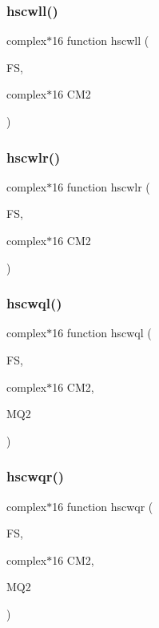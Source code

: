 \subsubsection{\texorpdfstring{hscwll()}{hscwll()}}
{\footnotesize\ttfamily complex$\ast$16 function hscwll (\begin{DoxyParamCaption}\item[{}]{FS,  }\item[{complex$\ast$16}]{C\+M2 }\end{DoxyParamCaption})}

\mbox{\label{djangoh__h_8f_aa1ed15a3dc1205d55ee3a8eeb774b5d5}} 
\subsubsection{\texorpdfstring{hscwlr()}{hscwlr()}}
{\footnotesize\ttfamily complex$\ast$16 function hscwlr (\begin{DoxyParamCaption}\item[{}]{FS,  }\item[{complex$\ast$16}]{C\+M2 }\end{DoxyParamCaption})}

\mbox{\label{djangoh__h_8f_a5bbc131d71e97e7f06c2e867bec24eec}} 
\subsubsection{\texorpdfstring{hscwql()}{hscwql()}}
{\footnotesize\ttfamily complex$\ast$16 function hscwql (\begin{DoxyParamCaption}\item[{}]{FS,  }\item[{complex$\ast$16}]{C\+M2,  }\item[{}]{M\+Q2 }\end{DoxyParamCaption})}

\mbox{\label{djangoh__h_8f_a67a8dbf09bfd8e694c25a01bc0341653}} 
\subsubsection{\texorpdfstring{hscwqr()}{hscwqr()}}
{\footnotesize\ttfamily complex$\ast$16 function hscwqr (\begin{DoxyParamCaption}\item[{}]{FS,  }\item[{complex$\ast$16}]{C\+M2,  }\item[{}]{M\+Q2 }\end{DoxyParamCaption})}

